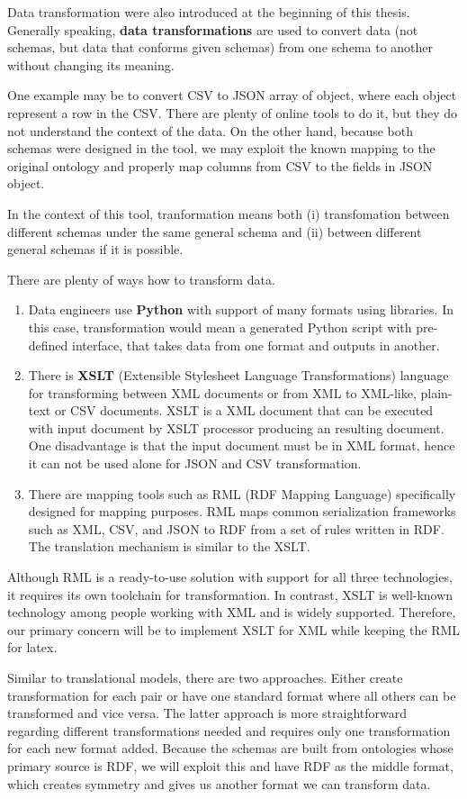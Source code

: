 Data transformation were also introduced at the beginning of this thesis. Generally speaking, \textbf{data transformations} are used to convert data (not schemas, but data that conforms given schemas) from one schema to another without changing its meaning.

One example may be to convert CSV to JSON array of object, where each object represent a row in the CSV. There are plenty of online tools to do it, but they do not understand the context of the data. On the other hand, because both schemas were designed in the tool, we may exploit the known mapping to the original ontology and properly map columns from CSV to the fields in JSON object.

In the context of this tool, tranformation means both (i) transfomation between different schemas under the same general schema and (ii) between different general schemas if it is possible.

There are plenty of ways how to transform data.
\begin{enumerate}
    \item Data engineers use \textbf{Python} with support of many formats using libraries. In this case, transformation would mean a generated Python script with pre-defined interface, that takes data from one format and outputs in another.
    \item There is \textbf{XSLT} (Extensible Stylesheet Language Transformations) language for transforming between XML documents or from XML to XML-like, plain-text or CSV documents. XSLT is a XML document that can be executed with input document by XSLT processor producing an resulting document. One disadvantage is that the input document must be in XML format, hence it can not be used alone for JSON and CSV transformation.
    \item There are mapping tools such as RML (RDF Mapping Language) specifically designed for mapping purposes. RML maps common serialization frameworks such as XML, CSV, and JSON to RDF from a set of rules written in RDF. The translation mechanism is similar to the XSLT.
\end{enumerate}

Although RML is a ready-to-use solution with support for all three technologies, it requires its own toolchain for transformation. In contrast, XSLT is well-known technology among people working with XML and is widely supported. Therefore, our primary concern will be to implement XSLT for XML while keeping the RML for latex.

Similar to translational models, there are two approaches. Either create transformation for each pair or have one standard format where all others can be transformed and vice versa. The latter approach is more straightforward regarding different transformations needed and requires only one transformation for each new format added. Because the schemas are built from ontologies whose primary source is RDF, we will exploit this and have RDF as the middle format, which creates symmetry and gives us another format we can transform data.

